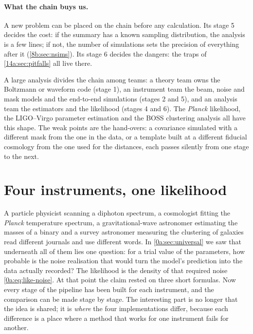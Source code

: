 \paragraph{What the chain buys us.}
A new problem can be placed on the chain before any calculation. Its stage 5 decides
the cost: if the summary has a known sampling distribution, the analysis is a few
lines; if not, the number of simulations sets the precision of everything after it
(\cref{8b:sec:nsims}). Its stage 6 decides the dangers: the traps of
\cref{14a:sec:pitfalls} all live there.

\begin{inpractice}
A large analysis divides the chain among teams: a theory team owns the Boltzmann or
waveform code (stage 1), an instrument team the beam, noise and mask models and the
end-to-end simulations (stages 2 and 5), and an analysis team the estimators and the
likelihood (stages 4 and 6). The \textit{Planck} likelihood, the LIGO--Virgo parameter
estimation and the BOSS clustering analysis all have this shape. The weak points are
the hand-overs: a covariance simulated with a different mask from the one in the data,
or a template built at a different fiducial cosmology from the one used for the
distances, each passes silently from one stage to the next.
\end{inpractice}
\section{Four instruments, one likelihood}\label{14a:sec:universal}

A particle physicist scanning a diphoton spectrum, a cosmologist fitting the
\textit{Planck} temperature spectrum, a gravitational-wave astronomer estimating the
masses of a binary and a survey astronomer measuring the clustering of galaxies read
different journals and use different words. In \cref{0a:sec:universal} we saw that
underneath all of them lies one question: for a trial value of the parameters, how
probable is the noise realisation that would turn the model's prediction into the data
actually recorded? The likelihood is the density of that required noise
\eqref{0a:eq:like-noise}. At that point the claim rested on three short formulas. Now
every stage of the pipeline has been built for each instrument, and the comparison can
be made stage by stage. The interesting part is no longer that the idea is shared; it
is \emph{where} the four implementations differ, because each difference is a place
where a method that works for one instrument fails for another.

